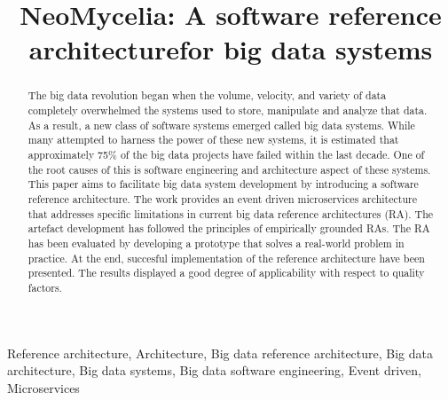 \documentclass[conference]{IEEEtran}
\begin{document}
\title{NeoMycelia: A software reference architecturefor big data systems\\
}

\author{
    \and
}

\maketitle


\begin{abstract}
    The big data revolution began when the volume, velocity, and variety of data completely overwhelmed the systems used to store, manipulate and analyze that data. As a result, a new class of software systems emerged called big data systems. While many attempted to harness the power of these new systems, it is estimated that approximately 75\% of the big data projects have failed within the last decade. One of the root causes of this is software engineering and architecture aspect of these systems. This paper aims to facilitate big data system development by introducing a software reference architecture. The work provides an event driven microservices architecture that addresses specific limitations in current big data reference architectures (RA). The artefact development has followed the principles of empirically grounded RAs. The RA has been evaluated by developing a prototype that solves a real-world problem in practice. At the end, succesful implementation of the reference architecture have been presented. The results displayed a good degree of applicability with respect to quality factors.
\end{abstract}


\begin{IEEEkeywords}
    Reference architecture, Architecture, Big data reference architecture, Big data architecture, Big data systems, Big data software engineering, Event driven, Microservices
\end{IEEEkeywords}
\end{document}
